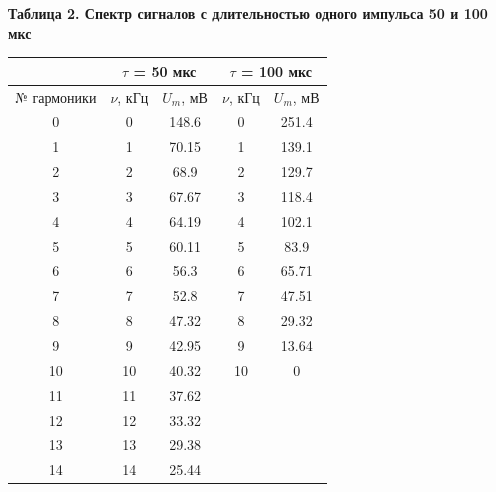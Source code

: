 \documentclass[15pt,a5paper,reqno]{article}
\begin{document}
        \noindent\hypertarget{table_2}{\textbf{Таблица 2. Спектр сигналов с длительностью одного импульса 50 и 100 мкс}}
        \begin{center}
            \begin{tabular}{|c|c|c|c|c|}
                 \hline
                             & \multicolumn{2}{|c|}{$\tau$ = 50 мкс} & \multicolumn{2}{|c|}{$\tau$ = 100 мкс} \\ \hline\hline
                 № гармоники &      $\nu$, кГц & $U_m$, мВ           &      $\nu$, кГц & $U_m$, мВ            \\ \hline
                        0    &              0  & 148.6               &               0 & 251.4 \\ \hline
                        1    &              1  & 70.15               &               1 & 139.1 \\ \hline
                        2    &              2  & 68.9                &               2 & 129.7 \\ \hline
                        3    &              3  & 67.67               &               3 & 118.4 \\ \hline
                        4    &              4  & 64.19               &               4 & 102.1 \\ \hline
                        5    &              5  & 60.11               &               5 & 83.9 \\ \hline
                        6    &              6  & 56.3                &               6 & 65.71 \\ \hline
                        7    &              7  & 52.8                &               7 & 47.51 \\ \hline
                        8    &              8  & 47.32               &               8 & 29.32 \\ \hline
                        9    &              9  & 42.95               &               9 & 13.64 \\ \hline
                        10   &             10 & 40.32                &              10 & 0 \\ \hline
                        11   &             11 & 37.62                & &\\ \hline
                        12   &             12 & 33.32                & &\\ \hline
                        13   &             13 & 29.38                & &\\ \hline
                        14   &             14 & 25.44                & &\\ \hline

\end{tabular}
\end{center}
\end{document}
